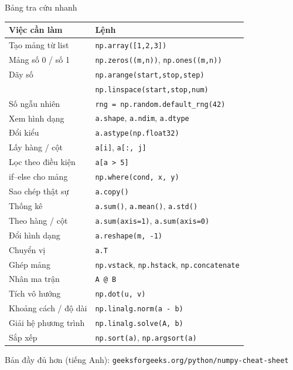 \documentclass[11pt]{beamer}
\begin{document}
\begin{frame}{Bảng tra cứu nhanh}
\begin{center}
\scriptsize
\renewcommand{\arraystretch}{0.9}
\begin{tabular}{|l|l|}
\hline
\textbf{Việc cần làm} & \textbf{Lệnh} \\
\hline
Tạo mảng từ list        & \texttt{np.array([1,2,3])} \\
Mảng số 0 / số 1        & \texttt{np.zeros((m,n))}, \texttt{np.ones((m,n))} \\
Dãy số                  & \texttt{np.arange(start,stop,step)} \\
                        & \texttt{np.linspace(start,stop,num)} \\
Số ngẫu nhiên           & \texttt{rng = np.random.default\_rng(42)} \\
Xem hình dạng           & \texttt{a.shape}, \texttt{a.ndim}, \texttt{a.dtype} \\
Đổi kiểu                & \texttt{a.astype(np.float32)} \\
Lấy hàng / cột          & \texttt{a[i]}, \texttt{a[:, j]} \\
Lọc theo điều kiện      & \texttt{a[a > 5]} \\
if--else cho mảng       & \texttt{np.where(cond, x, y)} \\
Sao chép thật sự        & \texttt{a.copy()} \\
Thống kê                & \texttt{a.sum()}, \texttt{a.mean()}, \texttt{a.std()} \\
Theo hàng / cột         & \texttt{a.sum(axis=1)}, \texttt{a.sum(axis=0)} \\
Đổi hình dạng           & \texttt{a.reshape(m, -1)} \\
Chuyển vị               & \texttt{a.T} \\
Ghép mảng               & \texttt{np.vstack}, \texttt{np.hstack}, \texttt{np.concatenate} \\
Nhân ma trận            & \texttt{A @ B} \\
Tích vô hướng           & \texttt{np.dot(u, v)} \\
Khoảng cách / độ dài    & \texttt{np.linalg.norm(a - b)} \\
Giải hệ phương trình    & \texttt{np.linalg.solve(A, b)} \\
Sắp xếp                 & \texttt{np.sort(a)}, \texttt{np.argsort(a)} \\
\hline
\end{tabular}
\end{center}
\begin{center}
\footnotesize Bản đầy đủ hơn (tiếng Anh): \texttt{geeksforgeeks.org/python/numpy-cheat-sheet}
\end{center}
\end{frame}
\end{document}
